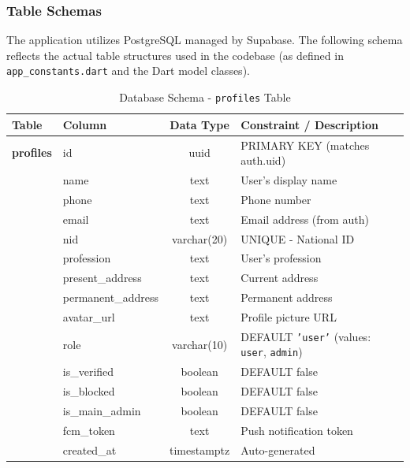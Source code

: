 \documentclass[12pt, a4paper, twoside, openany]{report}
\begin{document}
\subsubsection{Table Schemas}

The application utilizes PostgreSQL managed by Supabase. The following schema reflects the actual table structures used in the codebase (as defined in \texttt{app\_constants.dart} and the Dart model classes).
\begin{table}[ht]
\centering
\caption{Database Schema - \texttt{profiles} Table}
\label{tab:profiles}
\begin{tabularx}{\textwidth}{p{3cm} p{3cm} c X}
\toprule
\textbf{Table} & \textbf{Column} & \textbf{Data Type} & \textbf{Constraint / Description} \\
\midrule
\textbf{profiles} & id & uuid & PRIMARY KEY (matches auth.uid) \\
& name & text & User's display name \\
& phone & text & Phone number \\
& email & text & Email address (from auth) \\
& nid & varchar(20) & UNIQUE - National ID \\
& profession & text & User's profession \\
& present\_address & text & Current address \\
& permanent\_address & text & Permanent address \\
& avatar\_url & text & Profile picture URL \\
& role & varchar(10) & DEFAULT \texttt{'user'} (values: \texttt{user}, \texttt{admin}) \\
& is\_verified & boolean & DEFAULT false \\
& is\_blocked & boolean & DEFAULT false \\
& is\_main\_admin & boolean & DEFAULT false \\
& fcm\_token & text & Push notification token \\
& created\_at & timestamptz & Auto-generated \\
\bottomrule
\end{tabularx}
\end{table}
\end{document}
